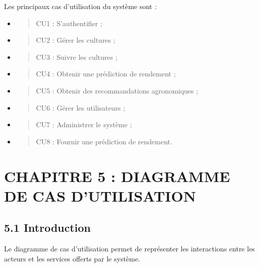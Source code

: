 \documentclass[
]{article}
\begin{document}
Les principaux cas d'utilisation du système sont :

\begin{itemize}
\item
  \begin{quote}
  CU1 : S'authentifier ;
  \end{quote}
\item
  \begin{quote}
  CU2 : Gérer les cultures ;
  \end{quote}
\item
  \begin{quote}
  CU3 : Suivre les cultures ;
  \end{quote}
\item
  \begin{quote}
  CU4 : Obtenir une prédiction de rendement ;
  \end{quote}
\item
  \begin{quote}
  CU5 : Obtenir des recommandations agronomiques ;
  \end{quote}
\item
  \begin{quote}
  CU6 : Gérer les utilisateurs ;
  \end{quote}
\item
  \begin{quote}
  CU7 : Administrer le système ;
  \end{quote}
\item
  \begin{quote}
  CU8 : Fournir une prédiction de rendement.
  \end{quote}
\end{itemize}

\hypertarget{chapitre-5-diagramme-de-cas-dutilisation}{%
\section{CHAPITRE 5 : DIAGRAMME DE CAS
D'UTILISATION}\label{chapitre-5-diagramme-de-cas-dutilisation}}

\hypertarget{introduction-2}{%
\subsection{5.1 Introduction}\label{introduction-2}}

Le diagramme de cas d'utilisation permet de représenter les interactions
entre les acteurs et les services offerts par le système.
\end{document}
